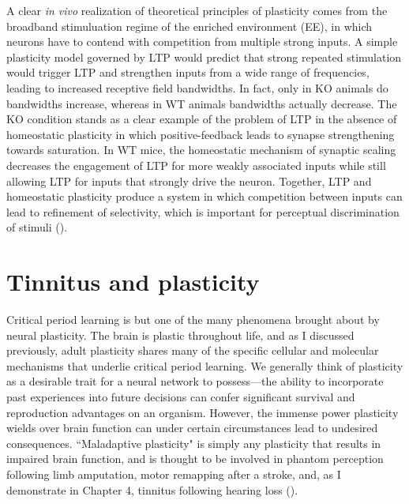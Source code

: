 A clear \textit{in vivo} realization of theoretical principles of plasticity comes from the broadband stimuluation regime of the enriched environment (EE), in which neurons have to contend with competition from multiple strong inputs. A simple plasticity model governed by LTP would predict that strong repeated stimulation would trigger LTP and strengthen inputs from a wide range of frequencies, leading to increased receptive field bandwidths. In fact, only in KO animals do bandwidths increase, whereas in WT animals bandwidths actually decrease. The KO condition stands as a clear example of the problem of LTP in the absence of homeostatic plasticity in which positive-feedback leads to synapse strengthening towards saturation. In WT mice, the homeostatic mechanism of synaptic scaling decreases the engagement of LTP for more weakly associated inputs while still allowing LTP for inputs that strongly drive the neuron. Together, LTP and homeostatic plasticity produce a system in which competition between inputs can lead to refinement of selectivity, which is important for perceptual discrimination of stimuli (\cite{Han2007}).

\section{Tinnitus and plasticity}

Critical period learning is but one of the many phenomena brought about by neural plasticity. The brain is plastic throughout life, and as I discussed previously, adult plasticity shares many of the specific cellular and molecular mechanisms that underlie critical period learning. We generally think of plasticity as a desirable trait for a neural network to possess---the ability to incorporate past experiences into future decisions can confer significant survival and reproduction advantages on an organism. However, the immense power plasticity wields over brain function can under certain circumstances lead to undesired consequences. ``Maladaptive plasticity" is simply any plasticity that results in impaired brain function, and is thought to be involved in phantom perception following limb amputation, motor remapping after a stroke, and, as I demonstrate in Chapter 4, tinnitus following hearing loss (\cite{Flor2006, Takeuchi2012}).

